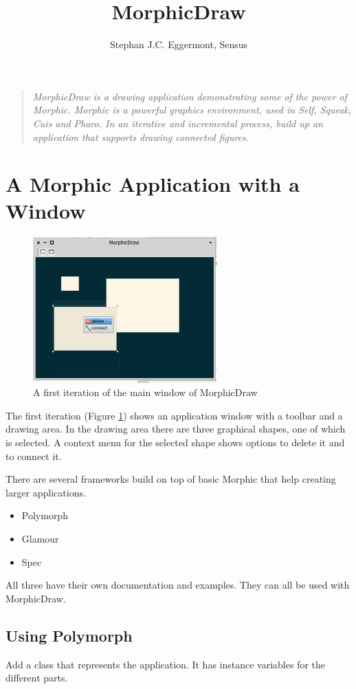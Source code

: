 \documentclass[10pt]{article}   	%
\title{MorphicDraw}
\author{Stephan J.C. Eggermont, Sensus}
\begin{document}
\setlength{\parindent}{0pt}
\maketitle
\begin{quote}
\em
MorphicDraw is a drawing application demonstrating some of the power of Morphic.
Morphic is a powerful graphics environment, used in Self, Squeak, Cuis and Pharo.
In an iterative and incremental process, build up an application that supports
drawing connected figures.
\end{quote} 
\section{A Morphic Application with a Window}
\begin{figure}[htb]
\begin{center}
\includegraphics[width=200pt]{SimpleMorphicDrawWindow.png}
\caption{A first iteration of the main window of MorphicDraw}
\label{1stIteration}
\end{center}
\end{figure}
The first iteration (Figure \ref{1stIteration})  shows an application window 
with a toolbar and a drawing area. In the drawing area there are 
three graphical shapes, one of which is selected. A context menu
for the selected shape shows options to delete it and to connect it.

There are several frameworks build on top of basic Morphic that
help creating larger applications.
\begin{itemize}
\item Polymorph
\item Glamour
\item Spec
\end{itemize}
All three have their own documentation and examples. They can all 
be used with MorphicDraw.
\subsection{Using Polymorph}
Add a class that represents the application. It has instance variables for 
the different parts. 
\end{document}
